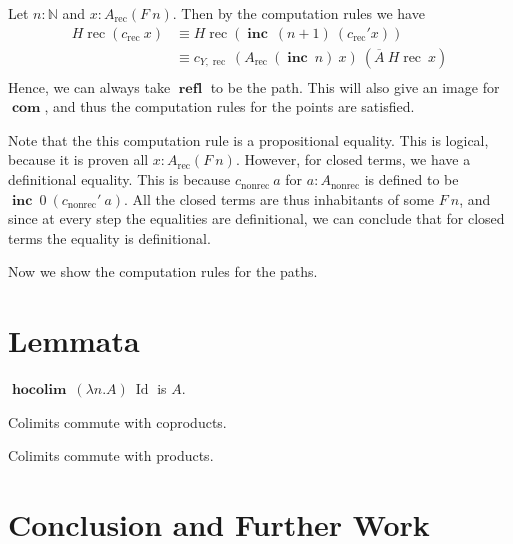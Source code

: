 \documentclass[a4paper,UKenglish]{lipics-v2016}
\newcommand{\frec}[0]{\!\operatorname{rec}}
\newcommand{\rec}[0]{\operatorname{rec}}
\newcommand{\nonrec}[0]{\operatorname{nonrec}}
\newcommand{\refl}[0]{\operatorname{\textbf{refl}}}
\newcommand{\hocolim}[0]{\operatorname{\textbf{hocolim}}}
\newcommand{\inc}[0]{\operatorname{\textbf{inc}}}
\newcommand{\com}[0]{\operatorname{\textbf{com}}}
\begin{document}
Let $n : \mathbb{N}$ and $x : A_{\rec}(F \> n)$.
Then by the computation rules we have
\begin{equation*}
\begin{split}
H\frec(c_{\rec} \> x) 
&\equiv H\frec(\inc \> (n+1) \> (c_{\rec}' x)) \\
&\equiv c_{Y,\rec} \> (A_{\rec} \> (\inc \> n) \> x) \> (\overline{A} \> H\frec \> x)\\
\end{split}
\end{equation*}
Hence, we can always take $\refl$ to be the path.
This will also give an image for $\com$, and thus the computation rules for the points are satisfied.

Note that the this computation rule is a propositional equality.
This is logical, because it is proven all $x : A_{\rec}(F \> n)$.
However, for closed terms, we have a definitional equality.
This is because $c_{\nonrec} \> a$ for $a : A_{\nonrec}$ is defined to be$\inc \> 0 \> (c_{\nonrec}' \> a)$.
All the closed terms are thus inhabitants of some $F \> n$, and since at every step the equalities are definitional, we can conclude that for closed terms the equality is definitional.

Now we show the computation rules for the paths.


\section{Lemmata}
\label{sec:Lemmata}

\begin{lemma}
$\hocolim \> (\lambda n . A) \> \operatorname{Id}$ is $A$.
\end{lemma}

\begin{lemma}
Colimits commute with coproducts.
\end{lemma}

\begin{lemma}
Colimits commute with products.
\end{lemma}

\section{Conclusion and Further Work}



\nocite{*}





\end{document}
